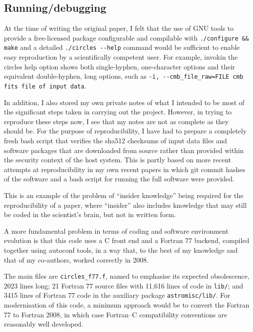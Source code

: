 \subsection{Running/debugging}

At the time of writing the original paper, I felt that the use of GNU
tools to provide a free-licensed package configurable and compilable
with {\tt ./configure \&\& make} and a detailed {\tt ./circles
  -{}-help} command would be sufficient to enable easy reproduction by
a scientifically competent user. For example, invokin the {\sc
  circles} help option shows both single-hyphen, one-character options
and their equivalent double-hyphen, long options, such as
\mbox{{\tt -i,  -{}-cmb\_file\_raw=FILE cmb fits file of input data}}.
\sloppy

\fussy
In addition, I also stored my own private notes of what I intended to
be most of the significant steps taken in carrying out the project.
However, in trying to reproduce these steps now, I see that my notes
are not as complete as they should be. For the purpose of
reproducibility, I have had to prepare a completely fresh {\sc bash}
script that verifies the sha512 checksums of input data files and
software packages that are downloaded from source rather than provided
within the security context of the host system. This is partly based
on more recent attempts at reproducibility in my own recent papers in
which {\sc git} commit hashes of the
software\supercite{Roukema17silvir} and a {\sc bash} script for
running the full software\supercite{RO19flatness} were provided.

This is an example of the problem of ``insider knowledge'' being
required for the reproducibility of a paper, where ``insider'' also
includes knowledge that may still be coded in the scientist's brain,
but not in written form.

A more fundamental problem in terms of coding and software
environment evolution is that this code uses a C front end and
a Fortran 77 backend, compiled together using {\sc autoconf}
tools, in a way that, to the best of my knowledge and that of
my co-authors, worked correctly in 2008.

The main files are {\tt circles\_f77.f}, named to emphasise its
expected obsolescence, 2023 lines long; 21 Fortran 77
source files with 11,616 lines of code in {\tt lib/}; and
3415 lines of Fortran 77 code in the auxiliary package
{\tt astromisc/lib/}. For modernisation of this code, a minimum
approach would be to convert the Fortran 77 to Fortran 2008,
in which case Fortran--C compatibility conventions are reasonably
well developed.


